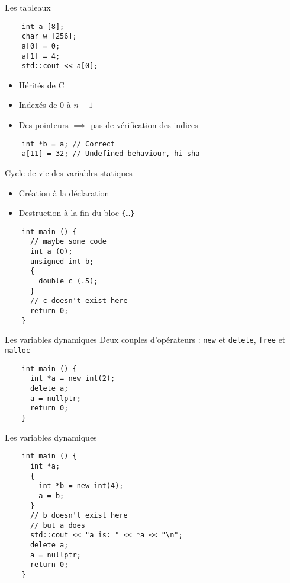 \begin{frame}[fragile]{Les tableaux}
  \begin{lstlisting}
    int a [8];
    char w [256];
    a[0] = 0;
    a[1] = 4;
    std::cout << a[0];
  \end{lstlisting}

  \begin{itemize}
  \item Hérités de C
  \item Indexés de 0 à $n-1$
  \item Des pointeurs $\implies$ pas de vérification des indices
  \end{itemize}

  \begin{lstlisting}
    int *b = a; // Correct
    a[11] = 32; // Undefined behaviour, hi sha
  \end{lstlisting}  
\end{frame}

\begin{frame}[fragile]{Cycle de vie des variables statiques}
  \begin{itemize}
  \item Création à la déclaration
  \item Destruction à la fin du bloc \texttt{\{\dots\}}
  \end{itemize}

  \begin{lstlisting}
    int main () {
      // maybe some code
      int a (0);
      unsigned int b;
      {
        double c (.5);
      }
      // c doesn't exist here
      return 0;
    }
  \end{lstlisting}
\end{frame}

\begin{frame}[fragile]{Les variables dynamiques}
  Deux couples d'opérateurs : \texttt{new} et \texttt{delete}, \texttt{free} et \texttt{malloc}
  \begin{lstlisting}
    int main () {
      int *a = new int(2);
      delete a;
      a = nullptr;
      return 0;
    }
  \end{lstlisting}
\end{frame}

\begin{frame}[fragile]{Les variables dynamiques}
  \begin{lstlisting}
    int main () {
      int *a;
      {
        int *b = new int(4);
        a = b;
      }
      // b doesn't exist here
      // but a does
      std::cout << "a is: " << *a << "\n";
      delete a;
      a = nullptr;
      return 0;
    }
  \end{lstlisting}
\end{frame}

